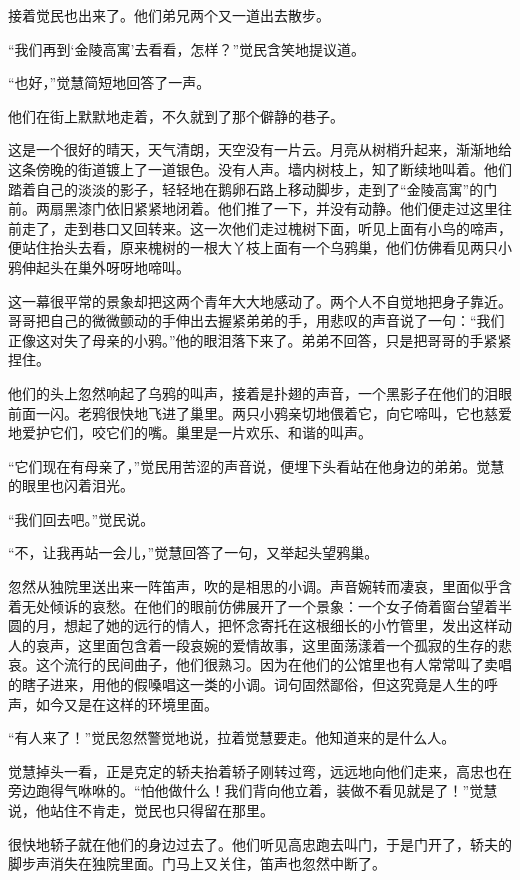 \par 接着觉民也出来了。他们弟兄两个又一道出去散步。
\par “我们再到‘金陵高寓’去看看，怎样？”觉民含笑地提议道。
\par “也好，”觉慧简短地回答了一声。
\par 他们在街上默默地走着，不久就到了那个僻静的巷子。
\par 这是一个很好的晴天，天气清朗，天空没有一片云。月亮从树梢升起来，渐渐地给这条傍晚的街道镀上了一道银色。没有人声。墙内树枝上，知了断续地叫着。他们踏着自己的淡淡的影子，轻轻地在鹅卵石路上移动脚步，走到了“金陵高寓”的门前。两扇黑漆门依旧紧紧地闭着。他们推了一下，并没有动静。他们便走过这里往前走了，走到巷口又回转来。这一次他们走过槐树下面，听见上面有小鸟的啼声，便站住抬头去看，原来槐树的一根大丫枝上面有一个乌鸦巢，他们仿佛看见两只小鸦伸起头在巢外呀呀地啼叫。
\par 这一幕很平常的景象却把这两个青年大大地感动了。两个人不自觉地把身子靠近。哥哥把自己的微微颤动的手伸出去握紧弟弟的手，用悲叹的声音说了一句：“我们正像这对失了母亲的小鸦。”他的眼泪落下来了。弟弟不回答，只是把哥哥的手紧紧捏住。
\par 他们的头上忽然响起了乌鸦的叫声，接着是扑翅的声音，一个黑影子在他们的泪眼前面一闪。老鸦很快地飞进了巢里。两只小鸦亲切地偎着它，向它啼叫，它也慈爱地爱护它们，咬它们的嘴。巢里是一片欢乐、和谐的叫声。
\par “它们现在有母亲了，”觉民用苦涩的声音说，便埋下头看站在他身边的弟弟。觉慧的眼里也闪着泪光。
\par “我们回去吧。”觉民说。
\par “不，让我再站一会儿，”觉慧回答了一句，又举起头望鸦巢。
\par 忽然从独院里送出来一阵笛声，吹的是相思的小调。声音婉转而凄哀，里面似乎含着无处倾诉的哀愁。在他们的眼前仿佛展开了一个景象：一个女子倚着窗台望着半圆的月，想起了她的远行的情人，把怀念寄托在这根细长的小竹管里，发出这样动人的哀声，这里面包含着一段哀婉的爱情故事，这里面荡漾着一个孤寂的生存的悲哀。这个流行的民间曲子，他们很熟习。因为在他们的公馆里也有人常常叫了卖唱的瞎子进来，用他的假嗓唱这一类的小调。词句固然鄙俗，但这究竟是人生的呼声，如今又是在这样的环境里面。
\par “有人来了！”觉民忽然警觉地说，拉着觉慧要走。他知道来的是什么人。
\par 觉慧掉头一看，正是克定的轿夫抬着轿子刚转过弯，远远地向他们走来，高忠也在旁边跑得气咻咻的。“怕他做什么！我们背向他立着，装做不看见就是了！”觉慧说，他站住不肯走，觉民也只得留在那里。
\par 很快地轿子就在他们的身边过去了。他们听见高忠跑去叫门，于是门开了，轿夫的脚步声消失在独院里面。门马上又关住，笛声也忽然中断了。
